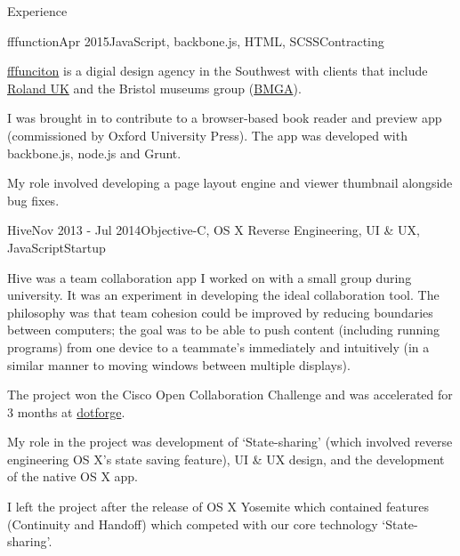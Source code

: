 \documentclass{resume} %
\begin{document}
\begin{rSection}{Experience}

\begin{rSubsection}{fffunction}{Apr 2015}{JavaScript, backbone.js, HTML, SCSS}{Contracting}
\item \href{http://fffunction.co/}{fffunciton} is a digial design agency in the Southwest with clients that include \href{http://www.roland.co.uk}{Roland UK} and the Bristol museums group (\href{http://bristolmuseums.org.uk}{BMGA}).
\item I was brought in to contribute to a browser-based book reader and preview app (commissioned by Oxford University Press). The app was developed with backbone.js, node.js and Grunt. 
\item My role involved developing a page layout engine and viewer thumbnail alongside bug fixes.
\end{rSubsection}


\begin{rSubsection}{Hive}{Nov 2013 - Jul 2014}{Objective-C, OS X Reverse Engineering,  UI \& UX, JavaScript}{Startup}
\item Hive was a team collaboration app I worked on with a small group during university. It was an experiment in developing the ideal collaboration tool. The philosophy was that team cohesion could be improved by reducing boundaries between computers; the goal was to be able to push content (including running programs) from one device to a teammate's immediately and intuitively (in a similar manner to moving windows between multiple displays).
\item The project won the Cisco Open Collaboration Challenge and was accelerated for 3 months at \href{http://www.dotforge.com/}{dotforge}.
\item My role in the project was development of `State-sharing' (which involved reverse engineering OS X's state saving feature), UI \& UX design, and the development of the native OS X app.
\item I left the project after the release of OS X Yosemite which contained features (Continuity and Handoff) which competed with our core technology `State-sharing'.
\end{rSubsection}


\end{rSection}
\end{document}
